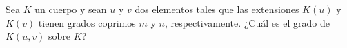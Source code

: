 \documentclass[a4paper, 11pt]{article}
\begin{document}
  \maketitle
  \begin{ejercicio}
      Sea \(K\) un cuerpo y sean \(u\) y \(v\) dos elementos tales que las extensiones \(K(u)\) y \(K(v)\) tienen grados coprimos \(m\) y \(n\), respectivamente. ¿Cuál es el grado de \(K(u,v)\) sobre $K$?
  \end{ejercicio}
\end{document}
